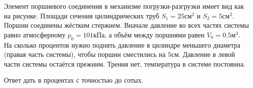 
Элемент поршневого соединения в механизме погрузки-разгрузки имеет вид как на рисунке. 
Площади сечения цилиндрических труб $  S_1 = 25 \text{см}^2 $ и $ S_2 = 5 \text{см}^2 $. 
Поршни соединены жёстким стержнем. Вначале давление во всех частях системы равно атмосферному 
$ p_0 = 101 \text{кПа} $, а объём между поршнями равен $ V_0=0.5\text{м}^3 $. 
На сколько процентов нужно поднять давление в цилиндре меньшего диаметра 
(правая часть системы), чтобы поршни сместились на $ 5\text{см} $. Давление в левой 
части системы остаётся прежним. Трения нет, температура в системе постоянна.


Ответ дать в процентах с точностью до сотых.

